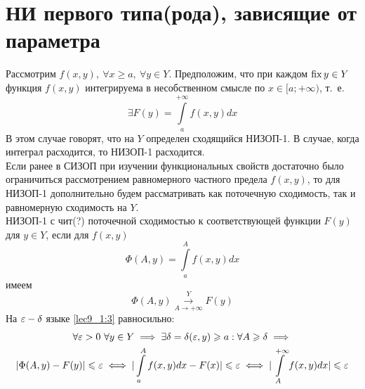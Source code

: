 \documentclass[../../main.tex]{subfiles}
\begin{document}
\section{НИ первого типа(рода), зависящие от параметра}

Рассмотрим $ f(x, y),\ \forall x \geq a,\ \forall y \in Y $.
Предположим, что при каждом $ \operatorname{fix} y \in Y $ функция $ f(x, y) $
интегрируема в несобственном смысле по $ x \in [a; +\infty) $, т.~е.
\begin{equation}
\label{lec9_1:1}
\exists F(y) = \int\limits_a^{+\infty} f(x, y) dx
\end{equation}
В этом случае говорят, что на $ Y $ определен сходящийся НИЗОП-1.
В случае, когда интеграл расходится, то НИЗОП-1 расходится.\\
Если ранее в СИЗОП при изучении функциональных свойств достаточно
было ограничиться рассмотрением равномерного частного предела $ f(x, y) $,
то для НИЗОП-1 дополнительно будем рассматривать как поточечную сходимость,
так и равномерную сходимость на $ Y $.\\
НИЗОП-1 с чит(?) поточечной сходимостью к соответствующей функции $ F(y) $
для $ y \in Y $, если для $ f(x, y) $ 
\begin{equation}
\label{lec9_1:2}
\Phi(A, y) = \int\limits_a^A f(x, y) dx
\end{equation}
имеем
\begin{equation}
\label{lec9_1:3}
\Phi(A, y) \stackrel{Y}{\underset{A \to +\infty}{\to}} F(y)
\end{equation}
На $ \varepsilon-\delta $ языке \eqref{lec9_1:3} равносильно:
\begin{equation}
\label{lec9_1:4}
\begin{gathered}
\forall \varepsilon > 0\ \forall y \in Y \implies \exists \delta = \delta(\varepsilon, y)
\geqslant a:\forall A \geqslant \delta \implies\\ 
|\Phi(A, y) - F(y)| \leqslant \varepsilon \iff
|\int\limits_a^A f(x, y) dx - F(x)| \leqslant \varepsilon \iff
|\int\limits_A^{+\infty} f(x, y) dx| \leqslant \varepsilon
\end{gathered}
\end{equation}
\end{document}
